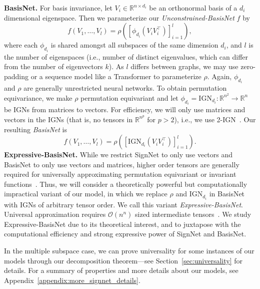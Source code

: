 \documentclass{article} \usepackage{iclr2023_conference,times}
\newcommand{\RR}{\mathbb R}
\newcommand{\mc}[1]{\mathcal{#1}}
\newcommand{\mrm}[1]{\mathrm{#1}}
\begin{document}
\textbf{BasisNet.} For basis invariance, let $V_i \in \RR^{n \times d_i}$ be an orthonormal basis of a $d_i$ dimensional eigenspace. Then we parameterize our \textit{Unconstrained-BasisNet}  $f$ by
\begin{equation}
    f(V_1, \ldots, V_{l}) = \rho\left([\phi_{d_i}(V_i V_i^\top)]_{i=1}^l \right),
\end{equation}
where each $\phi_{d_i}$ is shared amongst all subspaces of the same dimension $d_i$, and $l$ is the number of eigenspaces (i.e., number of distinct eigenvalues, which can differ from the number of eigenvectors $k$). As $l$ differs between graphs, we may use zero-padding or a sequence model like a Transformer to parameterize $\rho$. Again, $\phi_{d_i}$ and $\rho$ are generally unrestricted neural networks. To obtain permutation equivariance, we make $\rho$ permutation equivariant and let $\phi_{d_i} = \mrm{IGN}_{d_i} : \RR^{n^2} \to \RR^n$ be IGNs from matrices to vectors. For efficiency, we will only use matrices and vectors in the IGNs (that is, no tensors in $\RR^{n^p}$ for $p > 2$), i.e., we use 2-IGN~\citep{maron2018invariant}. Our resulting \textit{BasisNet} is
\begin{equation}
    f(V_1, \ldots, V_{l}) = \rho\left([\mrm{IGN}_{d_i}(V_i V_i^\top)]_{i=1}^l \right).
\end{equation}
\textbf{Expressive-BasisNet.} While we restrict SignNet to only use vectors and BasisNet to only use vectors and matrices,  higher order tensors are generally required for universally approximating permutation equivariant or invariant functions~\citep{keriven2019universal,maron2019universality,maehara2019simple}. Thus, we will consider a theoretically powerful but computationally impractical variant of our model, in which we replace $\rho$ and $\mrm{IGN}_{d_i}$ in BasisNet with IGNs of arbitrary tensor order. We call this variant \textit{Expressive-BasisNet}. Universal approximation requires $\mc O(n^n)$ sized intermediate tensors~\citep{ravanbakhsh2020universal}. 
We study Expressive-BasisNet due to its theoretical interest, and to juxtapose with the computational efficiency and strong expressive power of SignNet and BasisNet.


In the multiple subspace case, we can prove universality for some instances of our models through our decomposition theorem---see Section~\ref{sec:universality} for details. 
For a summary of properties and more details about our models, see Appendix~\ref{appendix:more_signnet_details}.
\end{document}

